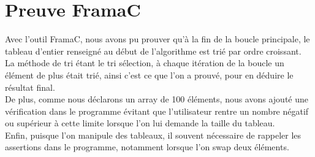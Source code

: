 \documentclass{scrreprt}
\begin{document}
\section{Preuve FramaC}
Avec l'outil FramaC, nous avons pu prouver qu'à la fin de la boucle principale, le tableau d'entier renseigné au début de l'algorithme est trié par ordre croissant.\\
La méthode de tri étant le tri sélection, à chaque itération de la boucle un élément de plus était trié, ainsi c'est ce que l'on a prouvé, pour en déduire le résultat final.\\
De plus, comme nous déclarons un array de 100 éléments, nous avons ajouté une vérification dans le programme évitant que l'utilisateur rentre un nombre négatif ou supérieur à cette limite lorsque l'on lui demande la taille du tableau.\\
Enfin, puisque l'on manipule des tableaux, il souvent nécessaire de rappeler les assertions dans le programme, notamment lorsque l'on swap deux éléments.\\
\end{document}
